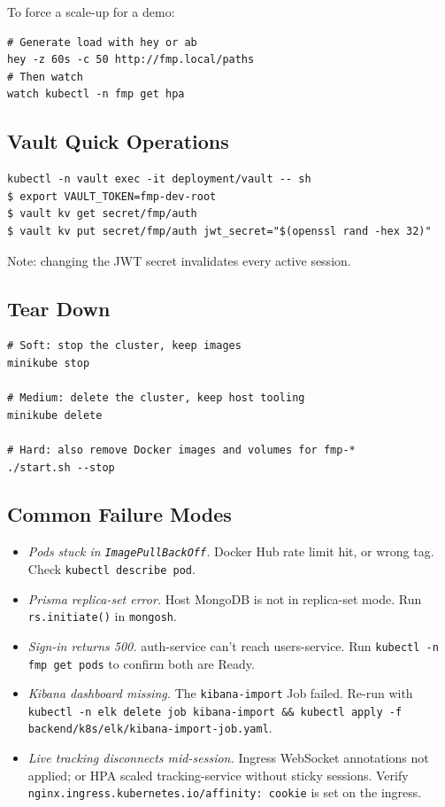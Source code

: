 \documentclass[11pt,a4paper]{article}
\begin{document}
To force a scale-up for a demo:

\begin{lstlisting}
# Generate load with hey or ab
hey -z 60s -c 50 http://fmp.local/paths
# Then watch
watch kubectl -n fmp get hpa
\end{lstlisting}

\subsection{Vault Quick Operations}
\begin{lstlisting}
kubectl -n vault exec -it deployment/vault -- sh
$ export VAULT_TOKEN=fmp-dev-root
$ vault kv get secret/fmp/auth
$ vault kv put secret/fmp/auth jwt_secret="$(openssl rand -hex 32)"
\end{lstlisting}

Note: changing the JWT secret invalidates every active session.

\subsection{Tear Down}
\begin{lstlisting}
# Soft: stop the cluster, keep images
minikube stop

# Medium: delete the cluster, keep host tooling
minikube delete

# Hard: also remove Docker images and volumes for fmp-*
./start.sh --stop
\end{lstlisting}

\subsection{Common Failure Modes}
\begin{itemize}[leftmargin=*]
  \item \emph{Pods stuck in \texttt{ImagePullBackOff}.}  Docker Hub
        rate limit hit, or wrong tag.  Check
        \texttt{kubectl describe pod}.
  \item \emph{Prisma replica-set error.}  Host MongoDB is not in
        replica-set mode.  Run \texttt{rs.initiate()} in
        \texttt{mongosh}.
  \item \emph{Sign-in returns 500.}  auth-service can't reach
        users-service.  Run
        \texttt{kubectl -n fmp get pods} to confirm both are
        Ready.
  \item \emph{Kibana dashboard missing.}  The
        \texttt{kibana-import} Job failed.  Re-run with
        \texttt{kubectl -n elk delete job kibana-import \&\&
        kubectl apply -f backend/k8s/elk/kibana-import-job.yaml}.
  \item \emph{Live tracking disconnects mid-session.}  Ingress
        WebSocket annotations not applied; or HPA scaled
        tracking-service without sticky sessions.  Verify
        \texttt{nginx.ingress.kubernetes.io/affinity: cookie} is
        set on the ingress.
\end{itemize}
\end{document}
